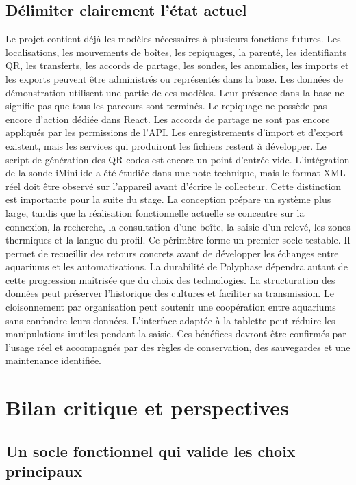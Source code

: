 \documentclass{article}
\let\oldsection\section
\renewcommand{\section}{\clearpage\oldsection}
\begin{document}
\subsection{Délimiter clairement l’état actuel}

Le projet contient déjà les modèles nécessaires à plusieurs fonctions futures. Les localisations, les mouvements de boîtes, les repiquages, la parenté, les identifiants QR, les transferts, les accords de partage, les sondes, les anomalies, les imports et les exports peuvent être administrés ou représentés dans la base. Les données de démonstration utilisent une partie de ces modèles.
Leur présence dans la base ne signifie pas que tous les parcours sont terminés. Le repiquage ne possède pas encore d’action dédiée dans React. Les accords de partage ne sont pas encore appliqués par les permissions de l’API. Les enregistrements d’import et d’export existent, mais les services qui produiront les fichiers restent à développer. Le script de génération des QR codes est encore un point d’entrée vide. L’intégration de la sonde iMinilide a été étudiée dans une note technique, mais le format XML réel doit être observé sur l’appareil avant d’écrire le collecteur.
Cette distinction est importante pour la suite du stage. La conception prépare un système plus large, tandis que la réalisation fonctionnelle actuelle se concentre sur la connexion, la recherche, la consultation d’une boîte, la saisie d’un relevé, les zones thermiques et la langue du profil. Ce périmètre forme un premier socle testable. Il permet de recueillir des retours concrets avant de développer les échanges entre aquariums et les automatisations.
La durabilité de Polypbase dépendra autant de cette progression maîtrisée que du choix des technologies. La structuration des données peut préserver l’historique des cultures et faciliter sa transmission. Le cloisonnement par organisation peut soutenir une coopération entre aquariums sans confondre leurs données. L’interface adaptée à la tablette peut réduire les manipulations inutiles pendant la saisie. Ces bénéfices devront être confirmés par l’usage réel et accompagnés par des règles de conservation, des sauvegardes et une maintenance identifiée.

\section{Bilan critique et perspectives}

\subsection{Un socle fonctionnel qui valide les choix principaux}
\end{document}
